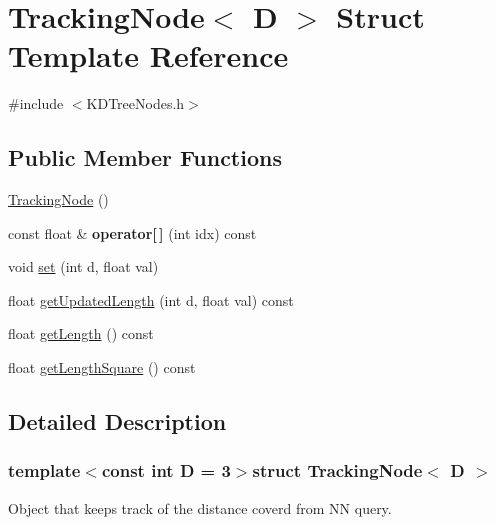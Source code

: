 \hypertarget{structTrackingNode}{\section{Tracking\-Node$<$ D $>$ Struct Template Reference}
\label{structTrackingNode}
}


{\ttfamily \#include $<$K\-D\-Tree\-Nodes.\-h$>$}

\subsection*{Public Member Functions}
\begin{DoxyCompactItemize}
\item 
\hyperlink{structTrackingNode_a267a71b15b0d843cbc902f9ea9e635d9}{Tracking\-Node} ()
\item 
\hypertarget{structTrackingNode_a8c289f42757184dc677a2f0911356c23}{const float \& {\bfseries operator\mbox{[}$\,$\mbox{]}} (int idx) const }\label{structTrackingNode_a8c289f42757184dc677a2f0911356c23}

\item 
void \hyperlink{structTrackingNode_ab7fb5d23dd3b6f976343ba19f42d9362}{set} (int d, float val)
\item 
float \hyperlink{structTrackingNode_a91fde5eefbd042ba4f71fc8c427b4728}{get\-Updated\-Length} (int d, float val) const 
\item 
float \hyperlink{structTrackingNode_a696ade4b521be9a03a139550ce6eb5ea}{get\-Length} () const 
\item 
float \hyperlink{structTrackingNode_a1625e77884398a094ab0f2a1270b363b}{get\-Length\-Square} () const 
\end{DoxyCompactItemize}


\subsection{Detailed Description}
\subsubsection*{template$<$const int D = 3$>$struct Tracking\-Node$<$ D $>$}

Object that keeps track of the distance coverd from N\-N query. 

